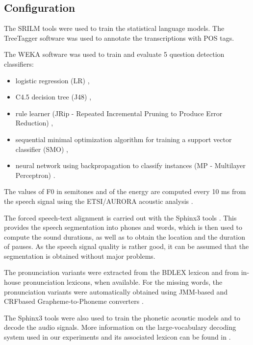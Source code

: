 \documentclass[runningheads,a4paper]{llncs}
\begin{document}
\subsection{Configuration}

The SRILM tools \cite{Stolcke:2002} were used to train the statistical language models.
The TreeTagger software \cite{Schmid:1994} was used to annotate the transcriptions with POS tags.

The WEKA software \cite{Hall:2009} was used to train and evaluate 5 question detection classifiers:
\begin{itemize}
\item logistic regression (LR) \cite{leCessie:1992},
\item C4.5 decision tree (J48) \cite{Quinlan:1993},
\item rule learner (JRip - Repeated Incremental Pruning to Produce Error Reduction) \cite{Cohen:1995},
\item sequential minimal optimization algorithm for training a support vector classifier (SMO) \cite{Keerthi:2001},
\item neural network using backpropagation to classify instances (MP - Multilayer Perceptron) \cite{Ruck:1990}.
\end{itemize}

The values of F0 in semitones and of the energy are computed every 10 ms from the speech signal using the ETSI/AURORA acoustic analysis \cite{ETSI:2005}.

The forced speech-text alignment is carried out with the Sphinx3 tools \cite{Placeway:1996}. This provides the speech segmentation into phones and words, which is then used to compute the sound durations, as well as to obtain the location and the duration of pauses. As the speech signal quality is rather good, it can be assumed that the segmentation is obtained without major problems.

The pronunciation variants were extracted from the BDLEX lexicon \cite{Calmes:1998} and from in-house pronunciation lexicons, when available.
For the missing words, the pronunciation variants were automatically obtained using JMM-based and CRFbased Grapheme-to-Phoneme converters \cite{Jouvet:2012}.

The Sphinx3 tools were also used to train the phonetic acoustic models and to decode the audio signals.
More information on the large-vocabulary decoding system used in our experiments and its associated lexicon can be found in \cite{Jouvet:2013-1,Jouvet:2013-2}.
\end{document}
